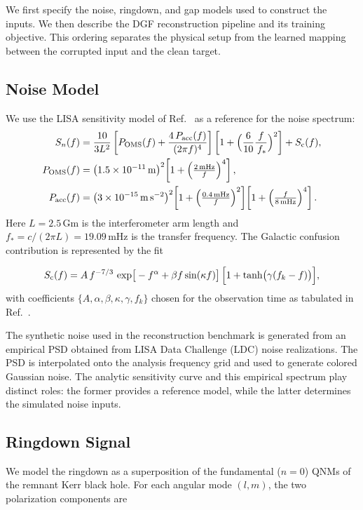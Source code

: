 \documentclass[prd,aps,a4paper,twocolumn,superscriptaddress,nofootinbib,floatfix]{revtex4-2}
\begin{document}
We first specify the noise, ringdown, and gap models used to construct the inputs. We then describe the DGF reconstruction pipeline and its training objective. This ordering separates the physical setup from the learned mapping between the corrupted input and the clean target.

\subsection{Noise Model}
\label{noise model}
We use the LISA sensitivity model of Ref.~\cite{Robson:2019psd} as a reference for the noise spectrum:
\begin{align}
S_n(f) &= \frac{10}{3L^2}
\left[
P_{\rm OMS}(f)
+\frac{4\,P_{\rm acc}(f)}{(2\pi f)^4}\right]
\left[1+\Big(\frac{6}{10}\frac{f}{\,f_\ast}\Big)^2\right] + S_{\rm c}(f),\\
P_{\rm OMS}(f) &=
\left(1.5\times10^{-11}\,{\rm m}\right)^2
\!\left[1+\left(\tfrac{2\,{\rm mHz}}{f}\right)^4\right],\\
P_{\rm acc}(f) &=
\left(3\times10^{-15}\,{\rm m\,s^{-2}}\right)^2
\!\left[1+\left(\tfrac{0.4\,{\rm mHz}}{f}\right)^2\right]
\!\left[1+\left(\tfrac{f}{8\,{\rm mHz}}\right)^4\right].
\label{sensitivity}
\end{align}
Here $L=2.5\,\mathrm{Gm}$ is the interferometer arm length and $f_\ast=c/(2\pi L)=19.09\,\mathrm{mHz}$ is the transfer frequency. The Galactic confusion contribution is represented by the fit~\cite{Cornish_2017}

\begin{equation}
S_{\rm c}(f)=
A\,f^{-7/3}\,
\exp\!\big[-f^\alpha+\beta f\sin(\kappa f)\big]\,
\Big[1+\tanh\!\big(\gamma(f_k-f)\big)\Big],
\label{eq:Sconf_refined}
\end{equation}
with coefficients \(\{A,\alpha,\beta,\kappa,\gamma,f_k\}\) chosen for the observation time as tabulated in Ref.~\cite{Robson:2019psd}.

The synthetic noise used in the reconstruction benchmark is generated from an empirical PSD obtained from LISA Data Challenge (LDC) noise realizations. The PSD is interpolated onto the analysis frequency grid and used to generate colored Gaussian noise. The analytic sensitivity curve and this empirical spectrum play distinct roles: the former provides a reference model, while the latter determines the simulated noise inputs.

\subsection{Ringdown Signal}
\label{ringdown signal}
We model the ringdown as a superposition of the fundamental ($n=0$) QNMs of the remnant Kerr black hole. For each angular mode $(l,m)$, the two polarization components are~\cite{Baibhav_2019,Berti_2007}
\end{document}
